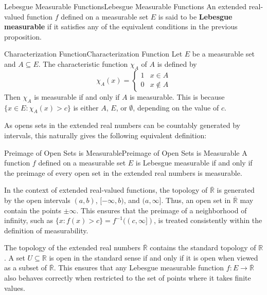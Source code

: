 \documentclass[../main.tex]{subfiles}
\begin{document}
\begin{definition}{Lebesgue Measurable Functions}{Lebesgue Measurable Functions}
	An extended real-valued function $f$ defined on a measurable set $E$ is said to be \textbf{Lebesgue measurable} if it satisfies any of the equivalent conditions in the previous proposition.
\end{definition}

\begin{example}{Characterization Function}{Characterization Function}
	Let $E$ be a measurable set and $A \subseteq E$. The characteristic function $\chi_A$ of $A$ is defined by
	\begin{equation*}
		\chi_A(x) =
		\begin{cases}
			1 & x \in A    \\
			0 & x \notin A
		\end{cases}
	\end{equation*}
	Then $\chi_A$ is measurable if and only if $A$ is measurable. This is because $\{x \in E : \chi_A(x) > c\}$ is either $A$, $E$, or $\emptyset$, depending on the value of $c$.
\end{example}

As opens sets in the extended real numbers can be countably generated by intervals, this naturally gives the following equivalent definition:

\begin{proposition}{Preimage of Open Sets is Measurable}{Preimage of Open Sets is Measurable}
	A function $f$ defined on a measurable set $E$ is Lebesgue measurable if and only if the preimage of every open set in the extended real numbers is measurable.
\end{proposition}

\begin{remark}
	In the context of extended real-valued functions, the topology of $\overline{\mathbb{R}}$ is generated by the open intervals $(a, b)$, $[-\infty, b)$, and $(a, \infty]$. Thus, an open set in $\overline{\mathbb{R}}$ may contain the points $\pm \infty$. This ensures that the preimage of a neighborhood of infinity, such as $\{x : f(x) > c\} = f^{-1}((c, \infty])$, is treated consistently within the definition of measurability.

	The topology of the extended real numbers $\overline{\mathbb{R}}$ contains the standard topology of $\mathbb{R}$. A set $U \subseteq \mathbb{R}$ is open in the standard sense if and only if it is open when viewed as a subset of $\overline{\mathbb{R}}$. This ensures that any Lebesgue measurable function $f: E \to \overline{\mathbb{R}}$ also behaves correctly when restricted to the set of points where it takes finite values.
\end{remark}
\end{document}
